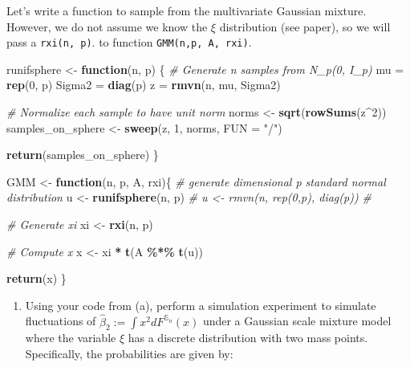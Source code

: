 \documentclass[
]{article}
\newenvironment{Shaded}{\begin{snugshade}}{\end{snugshade}}
\newcommand{\AttributeTok}[1]{\textcolor[rgb]{0.13,0.29,0.53}{#1}}
\newcommand{\CommentTok}[1]{\textcolor[rgb]{0.56,0.35,0.01}{\textit{#1}}}
\newcommand{\ControlFlowTok}[1]{\textcolor[rgb]{0.13,0.29,0.53}{\textbf{#1}}}
\newcommand{\DecValTok}[1]{\textcolor[rgb]{0.00,0.00,0.81}{#1}}
\newcommand{\FunctionTok}[1]{\textcolor[rgb]{0.13,0.29,0.53}{\textbf{#1}}}
\newcommand{\NormalTok}[1]{#1}
\newcommand{\OtherTok}[1]{\textcolor[rgb]{0.56,0.35,0.01}{#1}}
\newcommand{\SpecialCharTok}[1]{\textcolor[rgb]{0.81,0.36,0.00}{\textbf{#1}}}
\newcommand{\StringTok}[1]{\textcolor[rgb]{0.31,0.60,0.02}{#1}}
\providecommand{\tightlist}{%
  \setlength{\itemsep}{0pt}\setlength{\parskip}{0pt}}
\begin{document}
Let's write a function to sample from the multivariate Gaussian mixture.
However, we do not assume we know the \(\xi\) distribution (see paper),
so we will pass a \texttt{rxi(n,\ p)}. to function
\texttt{GMM(n,p,\ A,\ rxi)}.

\begin{Shaded}
\begin{Highlighting}[]
\NormalTok{runifsphere }\OtherTok{\textless{}{-}} \ControlFlowTok{function}\NormalTok{(n, p) \{}
  \CommentTok{\# Generate n samples from N\_p(0, I\_p)}
\NormalTok{  mu }\OtherTok{=} \FunctionTok{rep}\NormalTok{(}\DecValTok{0}\NormalTok{, p)}
\NormalTok{  Sigma2 }\OtherTok{=} \FunctionTok{diag}\NormalTok{(p) }
\NormalTok{  z }\OtherTok{=} \FunctionTok{rmvn}\NormalTok{(n, mu, Sigma2)}

  
  \CommentTok{\# Normalize each sample to have unit norm}
\NormalTok{  norms }\OtherTok{\textless{}{-}} \FunctionTok{sqrt}\NormalTok{(}\FunctionTok{rowSums}\NormalTok{(z}\SpecialCharTok{\^{}}\DecValTok{2}\NormalTok{))}
\NormalTok{  samples\_on\_sphere }\OtherTok{\textless{}{-}} \FunctionTok{sweep}\NormalTok{(z, }\DecValTok{1}\NormalTok{, norms, }\AttributeTok{FUN =} \StringTok{"/"}\NormalTok{)}
  
  \FunctionTok{return}\NormalTok{(samples\_on\_sphere)}
\NormalTok{\}}

\NormalTok{GMM }\OtherTok{\textless{}{-}} \ControlFlowTok{function}\NormalTok{(n, p, A, rxi)\{}
  \CommentTok{\# generate dimensional p standard normal distribution}
\NormalTok{  u }\OtherTok{\textless{}{-}} \FunctionTok{runifsphere}\NormalTok{(n, p)}
  \CommentTok{\# u \textless{}{-} rmvn(n, rep(0,p), diag(p)) \#}
  
  \CommentTok{\# Generate xi}
\NormalTok{  xi }\OtherTok{\textless{}{-}} \FunctionTok{rxi}\NormalTok{(n, p)}
  
  \CommentTok{\# Compute x}
\NormalTok{  x }\OtherTok{\textless{}{-}}\NormalTok{ xi }\SpecialCharTok{*} \FunctionTok{t}\NormalTok{(A }\SpecialCharTok{\%*\%} \FunctionTok{t}\NormalTok{(u))}
  
  \FunctionTok{return}\NormalTok{(x)}
\NormalTok{\}}
\end{Highlighting}
\end{Shaded}

\begin{enumerate}
\def\labelenumi{(\alph{enumi})}
\setcounter{enumi}{1}
\tightlist
\item
  Using your code from (a), perform a simulation experiment to simulate
  fluctuations of \(\hat{\beta}_2 := \int x^2dF^{\mathbb{S}_n}(x)\)
  under a Gaussian scale mixture model where the variable \(\xi\) has a
  discrete distribution with two mass points. Specifically, the
  probabilities are given by:
\end{enumerate}
\end{document}
